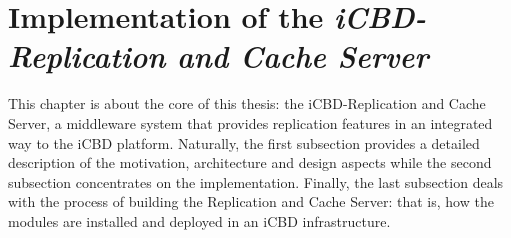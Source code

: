 \chapter{Implementation of the \textit{iCBD-Replication and Cache Server}}
\label{cha:impl_replication_caching}



This chapter is about the core of this thesis: the iCBD-Replication and Cache Server, a middleware
system that provides replication features in an integrated way to the iCBD platform. Naturally, the first subsection provides a detailed description of the motivation, architecture and design aspects while the second subsection concentrates on the implementation. Finally, the last subsection deals with the process of building the Replication and Cache Server: that is, how the modules are installed and deployed in an iCBD infrastructure.

